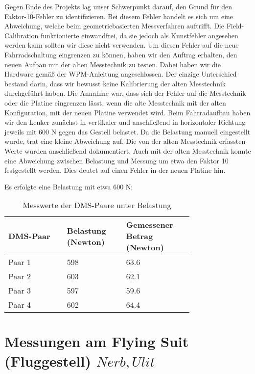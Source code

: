 Gegen Ende des Projekts lag unser Schwerpunkt darauf, den Grund für den Faktor-10-Fehler zu identifizieren.
Bei diesem Fehler handelt es sich um eine Abweichung, welche beim geometriebasierten Messverfahren auftrifft.
Die Field-Calibration funktionierte einwandfrei, da sie jedoch als Kunstfehler angesehen werden kann sollten wir diese nicht verwenden.
Um diesen Fehler auf die neue Fahrradschaltung eingrenzen zu können, haben wir den Auftrag erhalten, den neuen Aufbau mit der alten Messtechnik zu testen.
Dabei haben wir die Hardware gemäß der WPM-Anleitung angeschlossen. Der einzige Unterschied bestand darin, dass wir bewusst keine Kalibrierung der alten Messtechnik durchgeführt haben.
Die Annahme war, dass sich der Fehler auf die Messtechnik oder die Platine eingrenzen lässt, wenn die alte Messtechnik mit der alten Konfiguration,
mit der neuen Platine verwendet wird.
Beim Fahrradaufbau haben wir den Lenker zunächst in vertikaler und anschließend in horizontaler Richtung jeweils mit 600 N gegen das Gestell belastet.
Da die Belastung manuell eingestellt wurde, trat eine kleine Abweichung auf. Die von der alten Messtechnik erfassten Werte wurden anschließend dokumentiert.
Auch mit der alten Messtechnik konnte eine Abweichung zwischen Belastung und Messung um etwa den Faktor 10 festgestellt werden.
Dies deutet auf einen Fehler in der neuen Platine hin.

Es erfolgte eine Belastung mit etwa 600 N:

\begin{table}[h]
    \centering
    \begin{tabular}{|p{0.25\linewidth}|p{0.25\linewidth}|p{0.25\linewidth}|}
    \hline
    \textbf{DMS-Paar} & \textbf{Belastung (Newton)} & \textbf{Gemessener Betrag (Newton)} \\ \hline
    Paar 1 & 598 & 63.6 \\ \hline
    Paar 2 & 603 & 62.1 \\ \hline
    Paar 3 & 597 & 59.6 \\ \hline
    Paar 4 & 602 & 64.4 \\ \hline
    \end{tabular}
    \caption{Messwerte der DMS-Paare unter Belastung}
    \label{tbl:dms_messwerte}
\end{table}





\clearpage
\section{Messungen am Flying Suit (Fluggestell) \(Nerb, Ulit\)}
